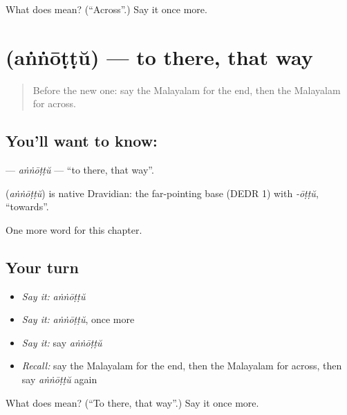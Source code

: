 \begin{tcolorbox}[breakable,colback=teal!4,colframe=teal!35!black,title={Before you move on}]
What does  mean? (\textquotedblleft{}Across\textquotedblright{}.) Say it once more.
\end{tcolorbox}
\section[\texorpdfstring{\ml{അങ്ങോട്ട്} (aṅṅōṭṭŭ)}{അങ്ങോട്ട് (aṅṅōṭṭŭ)}]{ (aṅṅōṭṭŭ) — to there, that way}

\label{lesson:ML-C240-annottu}



\begin{quote}
Before the new one: say the Malayalam for the end, then the Malayalam for across.
\end{quote}

\subsection*{You'll want to know: }
\textbf{} — \emph{aṅṅōṭṭŭ} — \textquotedblleft{}to there, that way\textquotedblright{}.

\begin{cousinweb}
\textbf{} (\emph{aṅṅōṭṭŭ}) is native Dravidian: the far-pointing base (DEDR 1) with \emph{-ōṭṭŭ}, \textquotedblleft{}towards\textquotedblright{}.
\end{cousinweb}

\begin{grammarlens}[title={What you've built}]
One more word for this chapter.
\end{grammarlens}

\subsection*{Your turn}
\begin{itemize}
\raggedright
  \item \emph{Say it:} \emph{aṅṅōṭṭŭ}
  \item \emph{Say it:} \emph{aṅṅōṭṭŭ}, once more
  \item \emph{Say it:} say \emph{aṅṅōṭṭŭ}
  \item \emph{Recall:} say the Malayalam for the end, then the Malayalam for across, then say \emph{aṅṅōṭṭŭ} again
\end{itemize}

\begin{tcolorbox}[breakable,colback=teal!4,colframe=teal!35!black,title={Before you move on}]
What does  mean? (\textquotedblleft{}To there, that way\textquotedblright{}.) Say it once more.
\end{tcolorbox}
